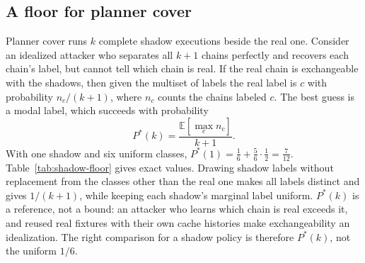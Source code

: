 \subsection{A floor for planner cover}\label{sec:floor}
Planner cover runs $k$ complete shadow executions beside the real one. Consider an idealized attacker who separates all $k+1$ chains perfectly and recovers each chain's label, but cannot tell which chain is real. If the real chain is exchangeable with the shadows, then given the multiset of labels the real label is $c$ with probability $n_c/(k+1)$, where $n_c$ counts the chains labeled $c$. The best guess is a modal label, which succeeds with probability
\[P^*(k)=\frac{\mathbb{E}[\max_c n_c]}{k+1}.\]
With one shadow and six uniform classes, $P^*(1)=\tfrac16+\tfrac56\cdot\tfrac12=\tfrac7{12}$. Table~\ref{tab:shadow-floor} gives exact values. Drawing shadow labels without replacement from the classes other than the real one makes all labels distinct and gives $1/(k+1)$, while keeping each shadow's marginal label uniform. $P^*(k)$ is a reference, not a bound: an attacker who learns which chain is real exceeds it, and reused real fixtures with their own cache histories make exchangeability an idealization. The right comparison for a shadow policy is therefore $P^*(k)$, not the uniform $1/6$.


